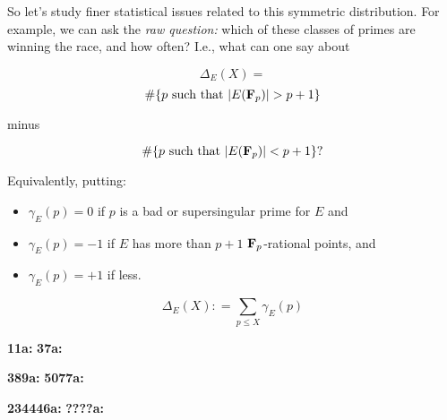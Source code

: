 \documentclass[12pt]{beamer}
\theoremstyle{definition}
\begin{document}
\begin{frame}
 \vskip40pt {\Large   So let's study  finer statistical issues related to this symmetric distribution.   For example,  we can ask the {\it raw question:}  which of these classes of primes are winning the race, and how often? I.e., what can one say about   }  \end{frame}

\begin{frame}
 \vskip40pt {\Large
 $$\Delta_E(X) =$$  \vskip20pt $$ \#\{p \ {\rm such\ that\ } |E({\bf F}_p)| > p+1\}$$ \vskip10pt \centerline{minus} \vskip10pt  $$ \#\{p \ {\rm such\ that\ } |E({\bf F}_p)| < p+1\}?$$}  \end{frame}

\begin{frame}
 \vskip40pt {\Large  Equivalently, putting:\begin{itemize} \item $\gamma_E(p)=0$ if $p$ is a bad or supersingular prime for $E$ and\vskip20pt \item $\gamma_E(p)= -1$ if $E$ has more than $p+1$  ${\bf F}_p$-rational points, and \vskip20pt \item $\gamma_E(p) = +1$ if less.\end{itemize}}\end{frame}

\begin{frame}
   $$\Delta_E(X): =\sum_{p\le X}\gamma_E(p)$$

{\bf 11a:}
{\bf 37a:}

{\bf 389a:}
{\bf 5077a:}

{\bf 234446a:}
{\bf ????a:}

\end{frame}
\end{document}
